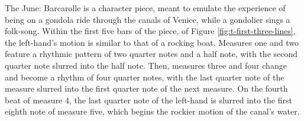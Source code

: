 The June: Barcarolle is a character piece, meant to emulate the experience of being on a gondola ride through the canals of Venice, while a gondolier sings a folk-song. Within the first five bars of the piece, of Figure \ref{fig:t-first-three-lines}\autocite{Henle_2002}, the left-hand's motion is similar to that of a rocking boat. Measures one and two feature a rhythmic pattern of two quarter notes and a half note, with the second quarter note slurred into the half note. Then, measures three and four change and become a rhythm of four quarter notes, with the last quarter note of the measure slurred into the first quarter note of the next measure. On the fourth beat of measure 4, the last quarter note of the left-hand is slurred into the first eighth note of measure five, which begins the rockier motion of the canal's water.

